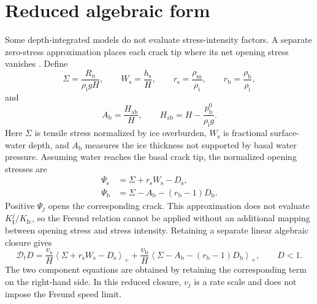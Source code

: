 \documentclass[11pt]{article}
\newcommand{\Dt}{\mathcal{D}_t}
\newcommand{\pos}[1]{\left\langle #1\right\rangle_{+}}
\newcommand{\rmi}{\mathrm{i}}
\newcommand{\rms}{\mathrm{s}}
\newcommand{\rmb}{\mathrm{b}}
\newcommand{\KI}[1]{K_{\mathrm{I}}^{#1}}
\newcommand{\KIc}{K_{\mathrm{Ic}}}
\begin{document}
\section{Reduced algebraic form}

Some depth-integrated models do not evaluate stress-intensity factors.  A
separate zero-stress approximation places each crack tip where its net opening
stress vanishes \citep{nye1955,nick2010}.  Define
\begin{equation}
 \Sigma=\frac{R_n}{\rho_{\rmi}gH},\qquad
 W_{\rms}=\frac{h_{\rms}}{H},\qquad
 r_{\rms}=\frac{\rho_{\mathrm{m}}}{\rho_{\rmi}},\qquad
 r_{\rmb}=\frac{\rho_{\rmb}}{\rho_{\rmi}},
 \label{eq:dimensionless-groups}
\end{equation}
and
\begin{equation}
 A_{\rmb}
 =\frac{H_{\mathrm{ab}}}{H},\qquad
 H_{\mathrm{ab}}
 =H-\frac{p_{\rmb}^{0}}{\rho_{\rmi}g}.
 \label{eq:height-above-buoyancy}
\end{equation}
Here \(\Sigma\) is tensile stress normalized by ice overburden,
\(W_{\rms}\) is fractional surface-water depth, and \(A_{\rmb}\) measures the
ice thickness not supported by basal water pressure.  Assuming water reaches
the basal crack tip, the normalized opening stresses are
\begin{align}
 \Psi_{\rms}
 &=\Sigma+r_{\rms}W_{\rms}-D_{\rms},
 \label{eq:surface-driver}\\
 \Psi_{\rmb}
 &=\Sigma-A_{\rmb}-(r_{\rmb}-1)D_{\rmb}.
 \label{eq:basal-driver}
\end{align}
Positive \(\Psi_j\) opens the corresponding crack.  This approximation does
not evaluate \(\KI{j}/\KIc\), so the Freund relation cannot be applied without
an additional mapping between opening stress and stress intensity.  Retaining
a separate linear algebraic closure gives
\begin{equation}
 \boxed{
 \Dt D
 =\frac{v_{\rms}}{H}
  \pos{\Sigma+r_{\rms}W_{\rms}-D_{\rms}}
 +\frac{v_{\rmb}}{H}
  \pos{\Sigma-A_{\rmb}-(r_{\rmb}-1)D_{\rmb}},
 \qquad D<1.
 }
 \label{eq:reduced-damage-law}
\end{equation}
The two component equations are obtained by retaining the corresponding term
on the right-hand side.  In this reduced closure, \(v_j\) is a rate scale and
does not impose the Freund speed limit.
\end{document}
